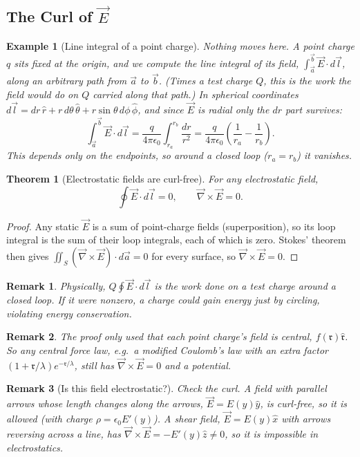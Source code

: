 \documentclass{article}
\newtheorem{theorem}{Theorem}
\newtheorem*{example}{Example}
\newtheorem{remark}{Remark}
\begin{document}
\subsection{The Curl of $\vec{E}$}
\begin{example}[Line integral of a point charge]
    Nothing moves here. A point charge $q$ sits fixed at the origin, and we compute the line integral of its field, $\int_{\vec{a}}^{\vec{b}}\vec{E}\cdot d\vec{l}$, along an arbitrary path from $\vec{a}$ to $\vec{b}$. (Times a test charge $Q$, this is the work the field would do on $Q$ carried along that path.) In spherical coordinates $d\vec{l} = dr\,\hat{r} + r\,d\theta\,\hat{\theta} + r\sin\theta\,d\phi\,\hat{\phi}$, and since $\vec{E}$ is radial only the $dr$ part survives:
    \[\int_{\vec{a}}^{\vec{b}}\vec{E}\cdot d\vec{l} = \frac{q}{4\pi\epsilon_0}\int_{r_a}^{r_b}\frac{dr}{r^2} = \frac{q}{4\pi\epsilon_0}\left(\frac{1}{r_a} - \frac{1}{r_b}\right).\]
    This depends only on the endpoints, so around a closed loop ($r_a = r_b$) it vanishes.
\end{example}
\begin{theorem}[Electrostatic fields are curl-free]
    For any electrostatic field,
    \begin{equation}
        \oint\vec{E}\cdot d\vec{l} = 0, \qquad \vec{\nabla}\times\vec{E} = 0.
    \end{equation}
\end{theorem}
\begin{proof}
    Any static $\vec{E}$ is a sum of point-charge fields (superposition), so its loop integral is the sum of their loop integrals, each of which is zero. Stokes' theorem then gives $\iint_S(\vec{\nabla}\times\vec{E})\cdot d\vec{a} = 0$ for every surface, so $\vec{\nabla}\times\vec{E} = 0$.
\end{proof}
\begin{remark}
    Physically, $Q\oint\vec{E}\cdot d\vec{l}$ is the work done on a test charge around a closed loop. If it were nonzero, a charge could gain energy just by circling, violating energy conservation.
\end{remark}
\begin{remark}
    The proof only used that each point charge's field is central, $f(\mathfrak{r})\hat{\mathfrak{r}}$. So any central force law, e.g.\ a modified Coulomb's law with an extra factor $(1+\mathfrak{r}/\lambda)e^{-\mathfrak{r}/\lambda}$, still has $\vec{\nabla}\times\vec{E} = 0$ and a potential.
\end{remark}
\begin{remark}[Is this field electrostatic?]
    Check the curl. A field with parallel arrows whose length changes along the arrows, $\vec{E} = E(y)\hat{y}$, is curl-free, so it is allowed (with charge $\rho = \epsilon_0 E'(y)$). A shear field, $\vec{E} = E(y)\hat{x}$ with arrows reversing across a line, has $\vec{\nabla}\times\vec{E} = -E'(y)\hat{z} \neq 0$, so it is impossible in electrostatics.
\end{remark}
\end{document}
